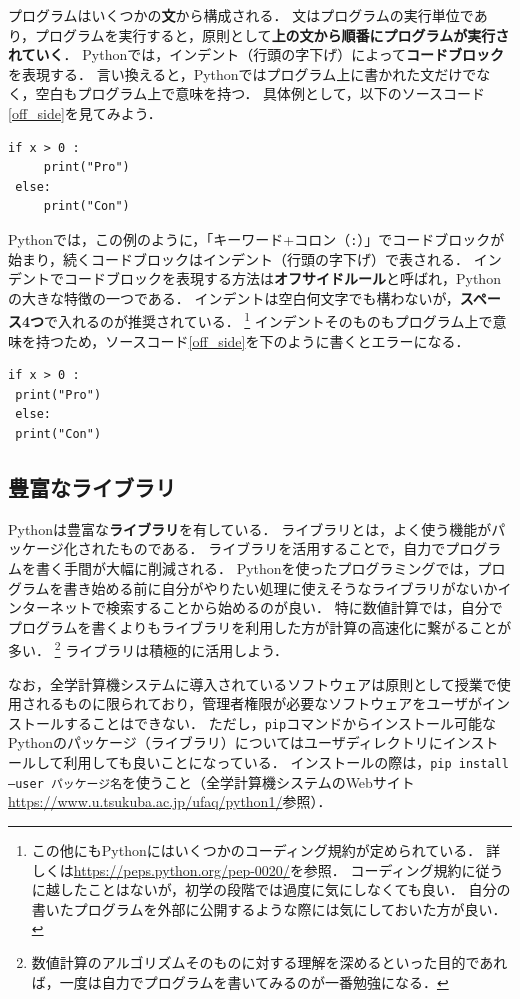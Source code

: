 \documentclass[a4paper,12pt]{jsarticle}
\begin{document}
プログラムはいくつかの{\bf 文}から構成される．
文はプログラムの実行単位であり，プログラムを実行すると，原則として{\bf 上の文から順番にプログラムが実行されていく}．
Pythonでは，インデント（行頭の字下げ）によって{\bf コードブロック}を表現する．
言い換えると，Pythonではプログラム上に書かれた文だけでなく，空白もプログラム上で意味を持つ．
具体例として，以下のソースコード\ref{off_side}を見てみよう．
\begin{lstlisting}[caption=インデントによるコードブロックの表現,label=off_side]
 if x > 0 :
     print("Pro")
 else:
     print("Con")
\end{lstlisting}
Pythonでは，この例のように，「キーワード+コロン（\texttt{:}）」でコードブロックが始まり，続くコードブロックはインデント（行頭の字下げ）で表される．
インデントでコードブロックを表現する方法は{\bf オフサイドルール}と呼ばれ，Pythonの大きな特徴の一つである．
インデントは空白何文字でも構わないが，{\bf スペース4つ}で入れるのが推奨されている．
\footnote{
この他にもPythonにはいくつかのコーディング規約が定められている．
詳しくは\url{https://peps.python.org/pep-0020/}を参照．
コーディング規約に従うに越したことはないが，初学の段階では過度に気にしなくても良い．
自分の書いたプログラムを外部に公開するような際には気にしておいた方が良い．
}
インデントそのものもプログラム上で意味を持つため，ソースコード\ref{off_side}を下のように書くとエラーになる．
\begin{lstlisting}[caption=インデントに起因してエラーとなる例,label=off_side_error]
 if x > 0 :
 print("Pro")
 else:
 print("Con")
\end{lstlisting}


\subsection{豊富なライブラリ}

Pythonは豊富な{\bf ライブラリ}を有している．
ライブラリとは，よく使う機能がパッケージ化されたものである．
ライブラリを活用することで，自力でプログラムを書く手間が大幅に削減される．
Pythonを使ったプログラミングでは，プログラムを書き始める前に自分がやりたい処理に使えそうなライブラリがないかインターネットで検索することから始めるのが良い．
特に数値計算では，自分でプログラムを書くよりもライブラリを利用した方が計算の高速化に繋がることが多い．
\footnote{
数値計算のアルゴリズムそのものに対する理解を深めるといった目的であれば，一度は自力でプログラムを書いてみるのが一番勉強になる．
}
ライブラリは積極的に活用しよう．

なお，全学計算機システムに導入されているソフトウェアは原則として授業で使用されるものに限られており，管理者権限が必要なソフトウェアをユーザがインストールすることはできない．
ただし，\texttt{pip}コマンドからインストール可能なPythonのパッケージ（ライブラリ）についてはユーザディレクトリにインストールして利用しても良いことになっている．
インストールの際は，\texttt{pip install --user パッケージ名}を使うこと（全学計算機システムのWebサイト\url{https://www.u.tsukuba.ac.jp/ufaq/python1/}参照）．
\end{document}
